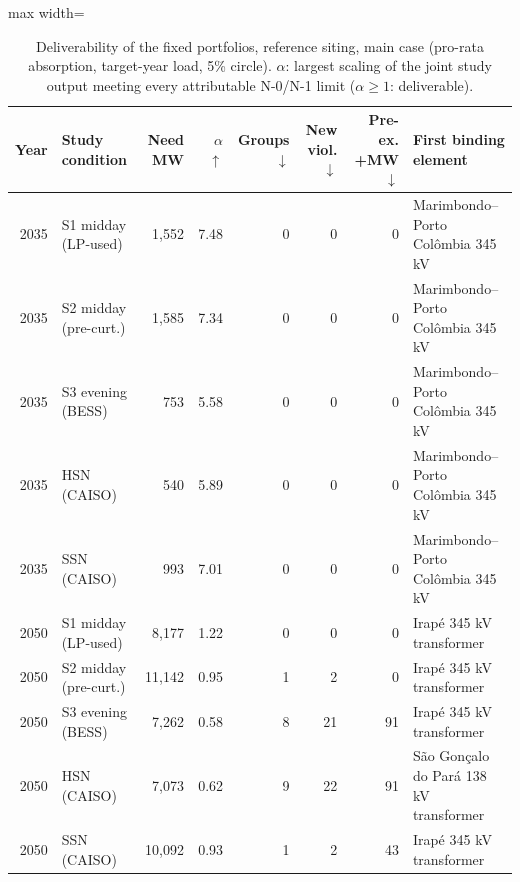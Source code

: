 \begin{table}[!htbp]
\centering
\footnotesize
\caption{Deliverability of the fixed portfolios, reference siting, main case (pro-rata absorption, target-year load, 5\% circle). $\alpha$: largest scaling of the joint study output meeting every attributable N-0/N-1 limit ($\alpha\ge1$: deliverable).}
\label{tab:deliv}
\begin{adjustbox}{max width=\linewidth}
\begin{tabular}{rlrrrrrl}
\toprule
Year & Study condition & Need MW & $\alpha$ $\uparrow$ & Groups $\downarrow$ & New viol. $\downarrow$ & Pre-ex. +MW $\downarrow$ & First binding element \\
\midrule
2035 & S1 midday (LP-used) & 1,552 & 7.48 & 0 & 0 & 0 & Marimbondo–Porto Colômbia 345 kV \\
2035 & S2 midday (pre-curt.) & 1,585 & 7.34 & 0 & 0 & 0 & Marimbondo–Porto Colômbia 345 kV \\
2035 & S3 evening (BESS) & 753 & 5.58 & 0 & 0 & 0 & Marimbondo–Porto Colômbia 345 kV \\
2035 & HSN (CAISO) & 540 & 5.89 & 0 & 0 & 0 & Marimbondo–Porto Colômbia 345 kV \\
2035 & SSN (CAISO) & 993 & 7.01 & 0 & 0 & 0 & Marimbondo–Porto Colômbia 345 kV \\
2050 & S1 midday (LP-used) & 8,177 & 1.22 & 0 & 0 & 0 & Irapé 345 kV transformer \\
2050 & S2 midday (pre-curt.) & 11,142 & 0.95 & 1 & 2 & 0 & Irapé 345 kV transformer \\
2050 & S3 evening (BESS) & 7,262 & 0.58 & 8 & 21 & 91 & Irapé 345 kV transformer \\
2050 & HSN (CAISO) & 7,073 & 0.62 & 9 & 22 & 91 & São Gonçalo do Pará 138 kV transformer \\
2050 & SSN (CAISO) & 10,092 & 0.93 & 1 & 2 & 43 & Irapé 345 kV transformer \\
\bottomrule
\end{tabular}
\end{adjustbox}
\end{table}
